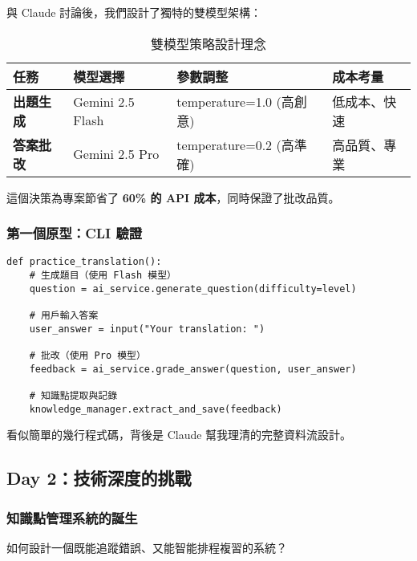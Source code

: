 \documentclass[11pt,a4paper]{article}
\begin{document}
與 Claude 討論後，我們設計了獨特的雙模型架構：

\begin{table}[ht]
\centering
\begin{tabular}{|C{2.5cm}|C{3.5cm}|C{3.5cm}|C{2.5cm}|}
\hline
{}
\textbf{任務} & \textbf{模型選擇} & \textbf{參數調整} & \textbf{成本考量} \\
\hline
\textbf{出題生成} & Gemini 2.5 Flash & temperature=1.0 (高創意) & 低成本、快速 \\
\hline
\textbf{答案批改} & Gemini 2.5 Pro & temperature=0.2 (高準確) & 高品質、專業 \\
\hline
\end{tabular}
\caption{雙模型策略設計理念}
\end{table}

這個決策為專案節省了 \textbf{60\% 的 API 成本}，同時保證了批改品質。

\subsubsection{第一個原型：CLI 驗證}

\begin{lstlisting}[style=py, caption={第一版 CLI 原型核心邏輯}]
def practice_translation():
    # 生成題目（使用 Flash 模型）
    question = ai_service.generate_question(difficulty=level)
    
    # 用戶輸入答案
    user_answer = input("Your translation: ")
    
    # 批改（使用 Pro 模型）
    feedback = ai_service.grade_answer(question, user_answer)
    
    # 知識點提取與記錄
    knowledge_manager.extract_and_save(feedback)
\end{lstlisting}

看似簡單的幾行程式碼，背後是 Claude 幫我理清的完整資料流設計。

\subsection{Day 2：技術深度的挑戰}

\subsubsection{知識點管理系統的誕生}

\begin{challenge}
如何設計一個既能追蹤錯誤、又能智能排程複習的系統？
\end{challenge}
\end{document}
